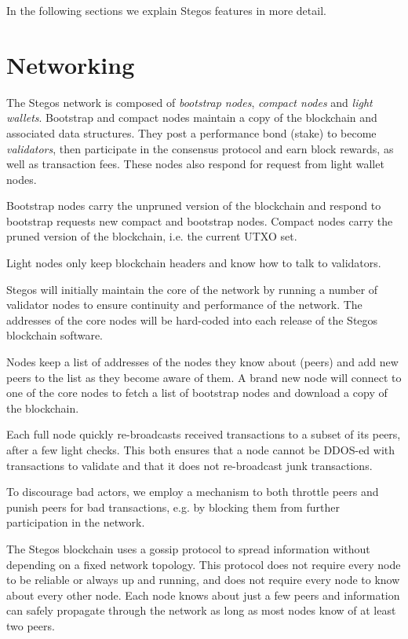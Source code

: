\documentclass[a4paper, 10pt, conference]{ieeeconf}
\begin{document}
In the following sections we explain Stegos features in more detail.

\section{Networking}\label{Networking}

The Stegos network is composed of \textit{bootstrap nodes}, \textit{compact nodes} and \textit{light wallets}. Bootstrap and compact nodes maintain a copy of the blockchain and associated data structures. They post a performance bond (stake) to become \textit{validators}, then participate in the consensus protocol and earn block rewards, as well as transaction fees. These nodes also respond for request from light wallet nodes.

Bootstrap nodes carry the unpruned version of the blockchain and respond to bootstrap requests new compact and bootstrap nodes. Compact nodes carry the pruned version of the blockchain, i.e. the current UTXO set.

Light nodes only keep blockchain headers and know how to talk to validators. 

Stegos will initially maintain the core of the network by running a number of validator nodes to ensure continuity and performance of the network. The addresses of the core nodes will be hard-coded into each release of the Stegos blockchain software.

Nodes keep a list of addresses of the nodes they know about (peers) and add new peers to the list as they become aware of them. A brand new node will connect to one of the core nodes to fetch a list of bootstrap nodes and download a copy of the blockchain. 

Each full node quickly re-broadcasts received transactions to a subset of its peers, after a few  light checks. This both ensures that a node cannot be DDOS-ed with transactions to validate and that it does not re-broadcast junk transactions.

To discourage bad actors, we employ a mechanism to both throttle peers and punish peers for bad transactions, e.g. by blocking them from further participation in the network.

The Stegos blockchain uses a gossip protocol to spread information without depending on a fixed network topology. This protocol does not require every node to be reliable or always up and running, and does not require every node to know about every other node. Each node knows about just a few peers and information can safely propagate through the network as long as most nodes know of at least two peers.
\end{document}
